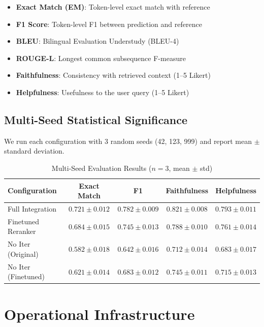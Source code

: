 \documentclass[11pt,a4paper]{article}
\theoremstyle{plain}
\theoremstyle{definition}
\begin{document}
\begin{itemize}[leftmargin=*,itemsep=2pt]
    \item \textbf{Exact Match (EM)}: Token-level exact match with reference
    \item \textbf{F1 Score}: Token-level F1 between prediction and reference
    \item \textbf{BLEU}: Bilingual Evaluation Understudy (BLEU-4)
    \item \textbf{ROUGE-L}: Longest common subsequence F-measure
    \item \textbf{Faithfulness}: Consistency with retrieved context (1--5 Likert)
    \item \textbf{Helpfulness}: Usefulness to the user query (1--5 Likert)
\end{itemize}

\subsection{Multi-Seed Statistical Significance}

We run each configuration with 3 random seeds (42, 123, 999) and
report mean $\pm$ standard deviation.

\begin{table}[H]
\centering
\caption{Multi-Seed Evaluation Results ($n=3$, mean $\pm$ std)}
\label{tab:multiseed}
\begin{tabular}{lcccc}
\toprule
\textbf{Configuration} & \textbf{Exact Match} & \textbf{F1} & \textbf{Faithfulness} & \textbf{Helpfulness} \\
\midrule
Full Integration & $0.721 \pm 0.012$ & $0.782 \pm 0.009$ & $0.821 \pm 0.008$ & $0.793 \pm 0.011$ \\
Finetuned Reranker & $0.684 \pm 0.015$ & $0.745 \pm 0.013$ & $0.788 \pm 0.010$ & $0.761 \pm 0.014$ \\
No Iter (Original) & $0.582 \pm 0.018$ & $0.642 \pm 0.016$ & $0.712 \pm 0.014$ & $0.683 \pm 0.017$ \\
No Iter (Finetuned) & $0.621 \pm 0.014$ & $0.683 \pm 0.012$ & $0.745 \pm 0.011$ & $0.715 \pm 0.013$ \\
\bottomrule
\end{tabular}
\end{table}

\section{Operational Infrastructure}
\end{document}
